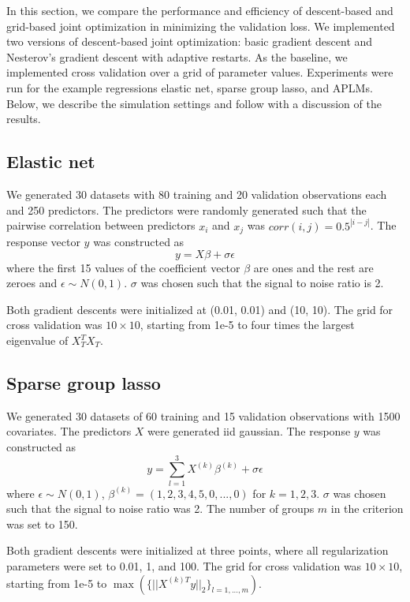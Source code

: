 \documentclass[10pt,letterpaper]{article}
\begin{document}
In this section, we compare the performance and efficiency of descent-based and grid-based joint optimization in minimizing the validation loss. We implemented two versions of descent-based joint optimization: basic gradient descent and Nesterov's gradient descent with adaptive restarts. As the baseline, we implemented cross validation over a grid of parameter values. Experiments were run for the example regressions elastic net, sparse group lasso, and APLMs. Below, we describe the simulation settings and follow with a discussion of the results.

\subsection{Elastic net}
We generated 30 datasets with 80 training and 20 validation observations each and 250 predictors. The predictors were randomly generated such that the pairwise correlation between predictors $x_i$ and $x_j$ was $corr(i,j) = 0.5^{|i-j|}$. The response vector $y$ was constructed as
\begin{equation}
y = X\beta + \sigma \epsilon
\end{equation}
where the first 15 values of the coefficient vector $\beta$ are ones and the rest are zeroes and $\epsilon \sim N(0, 1)$. $\sigma$ was chosen such that the signal to noise ratio is 2. 

Both gradient descents were initialized at (0.01, 0.01) and (10, 10). The grid for cross validation was $10 \times 10$, starting from 1e-5 to four times the largest eigenvalue of $X_T^T X_T$.

\subsection{Sparse group lasso}

We generated 30 datasets of 60 training and 15 validation observations with 1500 covariates. The predictors $X$ were generated iid gaussian. The response $y$ was constructed as
\begin{equation}
y = \sum\limits_{l=1}^3 X^{(k)} \beta^{(k)} + \sigma \epsilon
\end{equation}
where $\epsilon \sim N(0, 1)$, $\beta^{(k)} = (1, 2, 3, 4, 5, 0, ..., 0)$ for $k = 1, 2, 3$. $\sigma$ was chosen such that the signal to noise ratio was 2. The number of groups $m$ in the criterion was set to 150.

Both gradient descents were initialized at three points, where all regularization parameters were set to 0.01, 1, and 100. The grid for cross validation was $10 \times 10$, starting from 1e-5 to $\max(\{||X^{(k)T}y ||_2\}_{l=1,..., m})$.
\end{document}
